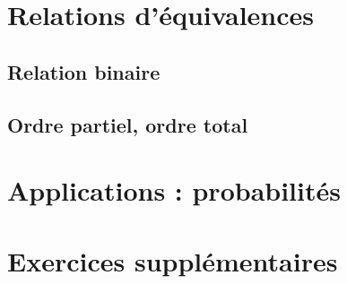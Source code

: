 
\section{Relations d'équivalences}

\subsection{Relation binaire}

\subsection{Ordre partiel, ordre total}

\section{Applications : probabilités}



\section*{Exercices supplémentaires}


%



